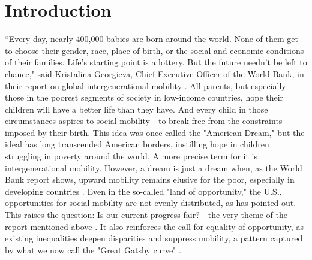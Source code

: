 \section{Introduction}

``Every day, nearly 400,000 babies are born around the world. None of them get to choose their gender, race, place of birth, or the social and economic conditions of their families. Life's starting point is a lottery. But the future needn't be left to chance," said Kristalina Georgieva, Chief Executive Officer of the World Bank, in their report on global intergenerational mobility \citep{narayan2018fair}. All parents, but especially those in the poorest segments of society in low-income countries, hope their children will have a better life than they have. And every child in those circumstances aspires to social mobility---to break free from the constraints imposed by their birth. This idea was once called the "American Dream," but the ideal has long transcended American borders, instilling hope in children struggling in poverty around the world. A more precise term for it is intergenerational mobility. However, a dream is just a dream when, as the World Bank report shows, upward mobility remains elusive for the poor, especially in developing countries \citep{narayan2018fair}. Even in the so-called "land of opportunity," the U.S., opportunities for social mobility are not evenly distributed, as \citet{chetty2014land} has pointed out. This raises the question: Is our current progress fair?---the very theme of the report mentioned above \citep{narayan2018fair}. It also reinforces the call for equality of opportunity, as existing inequalities deepen disparities and suppress mobility, a pattern captured by what we now call the "Great Gatsby curve" \citep{durlauf2022great}.


